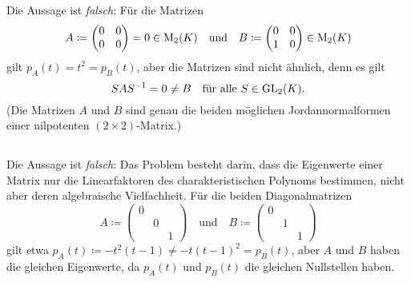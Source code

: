 \section{}





\subsection{}

Die Aussage ist \emph{falsch}:
Für die Matrizen
\[
            A
  \coloneqq \begin{pmatrix}
              0 & 0
              \\
              0 & 0
            \end{pmatrix}
  =         0
  \in       \operatorname{M}_{2}(K)
  \quad\text{und}\quad
            B
  \coloneqq \begin{pmatrix}
              0 & 0
              \\
              1 & 0
            \end{pmatrix}
  \in       \operatorname{M}_{2}(K)
\]
gilt $p_A(t) = t^2 = p_B(t)$, aber die Matrizen sind nicht ähnlich, denn es gilt
\[
        S A S^{-1} 
  =     0
  \neq  B
  \quad
  \text{für alle $S \in \operatorname{GL}_{2}(K)$}.
\]
(Die Matrizen $A$ und $B$ sind genau die beiden möglichen Jordannormalformen einer nilpotenten $(2 \times 2)$-Matrix.)





\subsection{}

Die Aussage ist \emph{falsch}:
Das Problem besteht darin, dass die Eigenwerte einer Matrix nur die Linearfaktoren des charakteristischen Polynoms bestimmen, nicht aber deren algebraische Vielfachheit.
Für die beiden Diagonalmatrizen
\[
            A
  \coloneqq \begin{pmatrix}
              0 &   &
              \\
                & 0 &
              \\
                &   & 1
            \end{pmatrix}
  \quad\text{und}\quad
            B
  \coloneqq \begin{pmatrix}
              0 &   &
              \\
                & 1 &
              \\
                &   & 1
            \end{pmatrix}
\]
gilt etwa $p_A(t) \coloneqq - t^2 (t-1) \neq - t (t-1)^2 = p_B(t)$, aber $A$ und $B$ haben die gleichen Eigenwerte, da $p_A(t)$ und $p_B(t)$ die gleichen Nullstellen haben.





